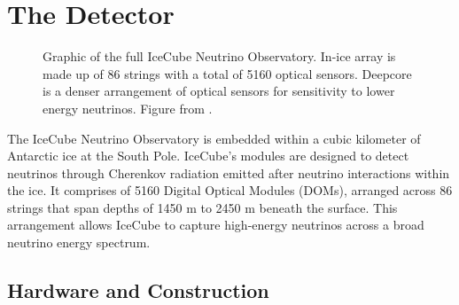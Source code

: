 \section{The Detector}

\begin{figure}
    \caption{Graphic of the full IceCube Neutrino Observatory. In-ice array is made up of 86 strings with a total of 5160 optical sensors. Deepcore is a denser arrangement of optical sensors for sensitivity to lower energy neutrinos. Figure from \cite{IceCube_SPGallery}.}
    \label{fig:IC3_full_detector}
\end{figure}

The IceCube Neutrino Observatory is embedded within a cubic kilometer of Antarctic ice at the South Pole.
IceCube's modules are designed to detect neutrinos through Cherenkov radiation emitted after neutrino interactions within the ice.
It comprises of 5160 Digital Optical Modules (DOMs), arranged across 86 strings that span depths of 1450 m to 2450 m beneath the surface.
This arrangement allows IceCube to capture high-energy neutrinos across a broad neutrino energy spectrum.

\subsection{Hardware and Construction}

